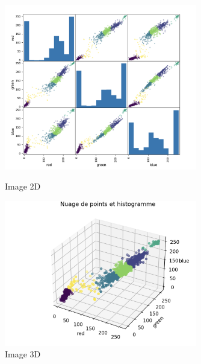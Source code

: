 \begin{figure}[!h]
    \begin{minipage}{.48\linewidth}
        \begin{center}
            \includegraphics[width=0.75\textwidth]{./img/6.8.1.png}
                \caption{\label{fig:6.4.1}Image 2D}  
            \end{center}
    \end{minipage}\hfill
    \begin{minipage}{.48\linewidth}
        \begin{center}
            \includegraphics[width=0.75\textwidth]{./img/6.8.2.png}
            \caption{\label{fig:6.4.2}Image 3D}  
        \end{center}
    \end{minipage}
\end{figure}

\clearpage

